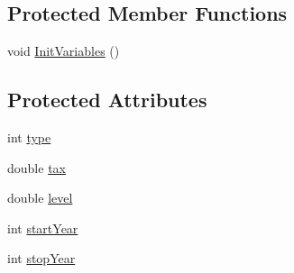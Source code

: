 \subsection*{Protected Member Functions}
\begin{DoxyCompactItemize}
\item 
void \hyperlink{classtax_legislation_a7779a3f675f559f66cbfaf62f73bf746}{InitVariables} ()
\end{DoxyCompactItemize}
\subsection*{Protected Attributes}
\begin{DoxyCompactItemize}
\item 
int \hyperlink{classtax_legislation_a0a6871fcffb1f92c0d5b8ae779c44513}{type}
\item 
double \hyperlink{classtax_legislation_adb4fa60260aacf3c1a45a70bd3ae04bc}{tax}
\item 
double \hyperlink{classtax_legislation_a6a3416e30e2b2a7ee0053792a688f21c}{level}
\item 
int \hyperlink{classtax_legislation_adbbadff2de7874d7791a8b49184efa20}{startYear}
\item 
int \hyperlink{classtax_legislation_af30a4ad86468d2d3e2e5916f8fec7c70}{stopYear}
\end{DoxyCompactItemize}


